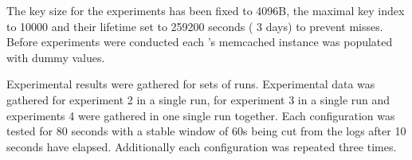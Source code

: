         The key size for the experiments has been fixed to 4096B, the maximal key index to 10000 and their lifetime
        set to 259200 seconds (\textrightarrow{} 3 days) to prevent misses. Before experiments were conducted
        each \srv{}'s memcached instance was populated with dummy values.

        Experimental results were gathered for sets of runs. Experimental data was gathered for experiment 2 in a
        single run, for experiment 3 in a single run and experiments 4 were gathered in one single run
        together. Each configuration was tested for 80 seconds with a stable window of 60s being cut from the logs
        after 10 seconds have elapsed. Additionally each configuration was repeated three times.
